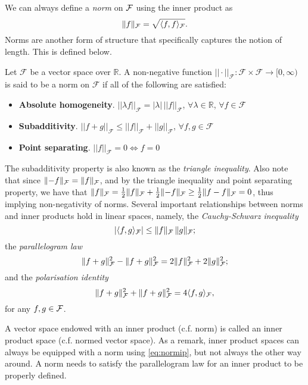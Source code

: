 We can always define a \emph{norm} on ${\mathcal F}$ using the inner product as 
\begin{equation}\label{eq:normip}
  \lVert f\rVert_{\mathcal F} = \sqrt{\langle f,f\rangle_{\mathcal F}}.
\end{equation}
Norms are another form of structure that specifically captures the notion of length. 
This is defined below.
%
\begin{definition}[Norms]
	Let $\mathcal F$ be a vector space over $\mathbb R$. A non-negative function $||\cdot||_{\mathcal F}:\mathcal F \times \mathcal F \rightarrow \mathbb [0,\infty)$ is said to be a norm  on $\mathcal F$ if all of the following are satisfied:
	\begin{itemize}
	\item \textbf{Absolute homogeneity}. $||\lambda f||_{\mathcal F} = |\lambda| \, ||f||_{\mathcal F}$, $\forall \lambda \in \mathbb R$, $\forall f \in \mathcal F$
	\item \textbf{Subadditivity}. $||f+g||_{\mathcal F} \leq ||f||_{\mathcal F} + ||g||_{\mathcal F}$, $\forall f,g \in \mathcal F$
	\item \textbf{Point separating}. $||f||_{\mathcal F} = 0 \Leftrightarrow f=0$
	\end{itemize}
\end{definition}
%
The subadditivity property is also known as the \emph{triangle inequality}.
Also note that since $\lVert-f\rVert_{\mathcal F} = \lVert f\rVert_{\mathcal F}$, and by the triangle inequality and point separating property, we have that $\lVert f\rVert_{\mathcal F} = \frac{1}{2}\lVert f\rVert_{\mathcal F} + \frac{1}{2}\lVert-f\rVert_{\mathcal F} \geq \frac{1}{2}\lVert f - f\rVert_{\mathcal F} = 0$, thus implying non-negativity of norms.
Several important relationships between norms and inner products hold in linear spaces, namely, the \emph{Cauchy-Schwarz inequality}
%
\[
  |\langle f,g\rangle_{\mathcal F}| \leq \lVert f\rVert_{\mathcal F} \, \lVert g\rVert_{\mathcal F};
\]
%
the \emph{parallelogram law}
%
\[
  \lVert f+g\rVert_{\mathcal F}^2 - \lVert f+g\rVert_{\mathcal F}^2 = 2\lVert f\rVert_{\mathcal F}^2 + 2\lVert g\rVert_{\mathcal F}^2;
\]
%
and the \emph{polarisation identity}
%
\[
  \lVert f+g\rVert_{\mathcal F}^2 + \lVert f+g\rVert_{\mathcal F}^2 = 4\langle f,g\rangle_{\mathcal F},
\]
%
for any $f,g\in{\mathcal F}$.

A vector space endowed with an inner product (c.f. norm) is called an inner product space (c.f. normed vector space).
As a remark, inner product spaces can always be equipped with a norm using \cref{eq:normip}, but not always the other way around.
A norm needs to satisfy the parallelogram law for an inner product to be properly defined.

